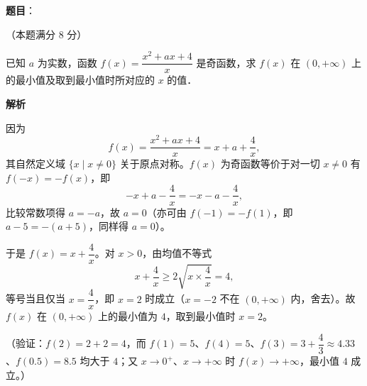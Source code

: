 \begin{answer}

\textbf{题目}：

（本题满分 8 分）

已知 \(a\) 为实数，函数 \(f(x)=\dfrac{x^{2}+ax+4}{x}\) 是奇函数，求 \(f(x)\) 在 \((0,+\infty)\) 上的最小值及取到最小值时所对应的 \(x\) 的值．

\textbf{解析}

因为
\nopagebreak[4]
\[
f(x)=\frac{x^{2}+ax+4}{x}=x+a+\frac{4}{x},
\]
其自然定义域 \(\{x\mid x\neq0\}\) 关于原点对称。\(f(x)\) 为奇函数等价于对一切 \(x\neq0\) 有 \(f(-x)=-f(x)\)，即
\nopagebreak[4]
\[
-x+a-\frac{4}{x}=-x-a-\frac{4}{x},
\]
比较常数项得 \(a=-a\)，故 \(a=0\)（亦可由 \(f(-1)=-f(1)\)，即 \(a-5=-(a+5)\)，同样得 \(a=0\)）。

于是 \(f(x)=x+\dfrac{4}{x}\)。对 \(x>0\)，由均值不等式
\nopagebreak[4]
\[
x+\frac{4}{x}\geqslant2\sqrt{x\times\frac{4}{x}}=4,
\]
等号当且仅当 \(x=\dfrac{4}{x}\)，即 \(x=2\) 时成立（\(x=-2\) 不在 \((0,+\infty)\) 内，舍去）。故 \(f(x)\) 在 \((0,+\infty)\) 上的最小值为 \(4\)，取到最小值时 \(x=2\)。

（验证：\(f(2)=2+2=4\)，而 \(f(1)=5\)、\(f(4)=5\)、\(f(3)=3+\dfrac{4}{3}\approx4.33\)、\(f(0.5)=8.5\) 均大于 \(4\)；又 \(x\to0^{+}\)、\(x\to+\infty\) 时 \(f(x)\to+\infty\)，最小值 \(4\) 成立。）


\end{answer}
